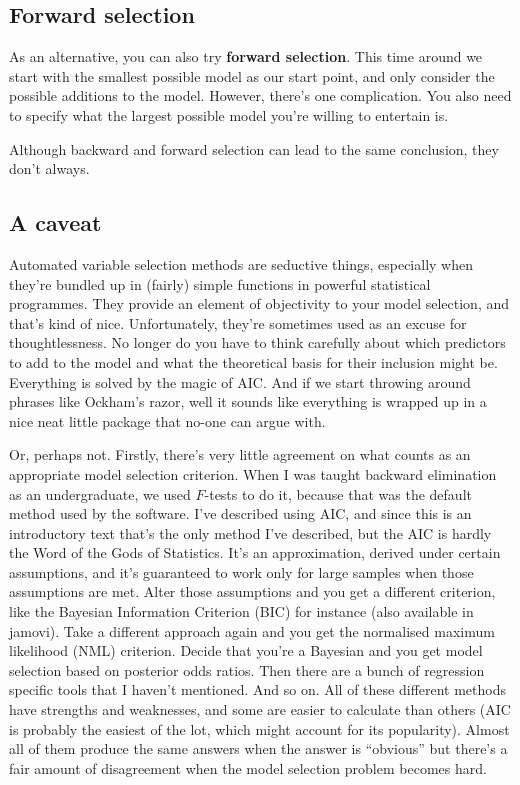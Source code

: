 \documentclass[
  a4paper,
]{book}
\begin{document}
\hypertarget{forward-selection}{%
\subsection{Forward selection}\label{forward-selection}}

As an alternative, you can also try \textbf{forward selection}. This
time around we start with the smallest possible model as our start
point, and only consider the possible additions to the model. However,
there's one complication. You also need to specify what the largest
possible model you're willing to entertain is.

Although backward and forward selection can lead to the same conclusion,
they don't always.

\hypertarget{a-caveat}{%
\subsection{A caveat}\label{a-caveat}}

Automated variable selection methods are seductive things, especially
when they're bundled up in (fairly) simple functions in powerful
statistical programmes. They provide an element of objectivity to your
model selection, and that's kind of nice. Unfortunately, they're
sometimes used as an excuse for thoughtlessness. No longer do you have
to think carefully about which predictors to add to the model and what
the theoretical basis for their inclusion might be. Everything is solved
by the magic of AIC. And if we start throwing around phrases like
Ockham's razor, well it sounds like everything is wrapped up in a nice
neat little package that no-one can argue with.

Or, perhaps not. Firstly, there's very little agreement on what counts
as an appropriate model selection criterion. When I was taught backward
elimination as an undergraduate, we used \(F\)-tests to do it, because
that was the default method used by the software. I've described using
AIC, and since this is an introductory text that's the only method I've
described, but the AIC is hardly the Word of the Gods of Statistics.
It's an approximation, derived under certain assumptions, and it's
guaranteed to work only for large samples when those assumptions are
met. Alter those assumptions and you get a different criterion, like the
Bayesian Information Criterion (BIC) for instance (also available in
jamovi). Take a different approach again and you get the normalised
maximum likelihood (NML) criterion. Decide that you're a Bayesian and
you get model selection based on posterior odds ratios. Then there are a
bunch of regression specific tools that I haven't mentioned. And so on.
All of these different methods have strengths and weaknesses, and some
are easier to calculate than others (AIC is probably the easiest of the
lot, which might account for its popularity). Almost all of them produce
the same answers when the answer is ``obvious'' but there's a fair
amount of disagreement when the model selection problem becomes hard.
\end{document}
